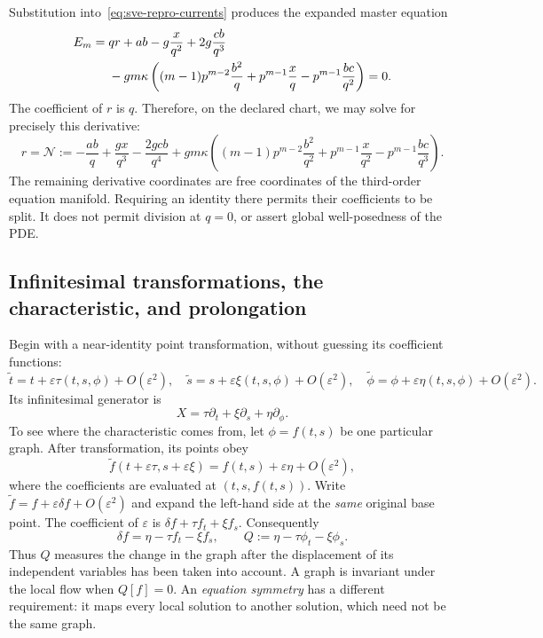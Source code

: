 Substitution into~\eqref{eq:sve-repro-currents} produces the expanded master
equation
\begin{align}
 E_m={}&qr+ab-g\frac{x}{q^2}+2g\frac{cb}{q^3}\notag\\
 &-gm\kappa\left((m-1)p^{m-2}\frac{b^2}{q}
       +p^{m-1}\frac{x}{q}-p^{m-1}\frac{bc}{q^2}\right)=0.
 \label{eq:sve-repro-master}
\end{align}
The coefficient of $r$ is $q$. Therefore, on the declared chart, we may solve
for precisely this derivative:
\begin{equation}
 r=\mathcal N:=-\frac{ab}{q}+\frac{gx}{q^3}-\frac{2gcb}{q^4}
 +gm\kappa\left((m-1)p^{m-2}\frac{b^2}{q^2}
              +p^{m-1}\frac{x}{q^2}-p^{m-1}\frac{bc}{q^3}\right).
 \label{eq:sve-master-normal}
\end{equation}
The remaining derivative coordinates are free coordinates of the
third-order equation manifold. Requiring an identity there permits their
coefficients to be split. It does not permit division at $q=0$, or assert
global well-posedness of the PDE.

\subsection{Infinitesimal transformations, the characteristic, and prolongation}
Begin with a near-identity point transformation, without guessing its
coefficient functions:
\begin{equation}
 \widetilde t=t+\varepsilon\tau(t,s,\phi)+O(\varepsilon^2),\quad
 \widetilde s=s+\varepsilon\xi(t,s,\phi)+O(\varepsilon^2),\quad
 \widetilde\phi=\phi+\varepsilon\eta(t,s,\phi)+O(\varepsilon^2).
 \label{eq:sve-small-transformation}
\end{equation}
Its infinitesimal generator is
\[
 X=\tau\partial_t+\xi\partial_s+\eta\partial_\phi.
\]
To see where the characteristic comes from, let $\phi=f(t,s)$ be one
particular graph. After transformation, its points obey
\[
 \widetilde f(t+\varepsilon\tau,s+\varepsilon\xi)
       =f(t,s)+\varepsilon\eta+O(\varepsilon^2),
\]
where the coefficients are evaluated at $(t,s,f(t,s))$. Write
$\widetilde f=f+\varepsilon\delta f+O(\varepsilon^2)$ and expand the
left-hand side at the \emph{same} original base point. The coefficient of
$\varepsilon$ is $\delta f+\tau f_t+\xi f_s$. Consequently
\begin{equation}
 \delta f=\eta-\tau f_t-\xi f_s,
 \qquad Q:=\eta-\tau\phi_t-\xi\phi_s.
 \label{eq:sve-characteristic-derived}
\end{equation}
Thus $Q$ measures the change in the graph after the displacement of its
independent variables has been taken into account. A graph is invariant
under the local flow when $Q[f]=0$. An \emph{equation symmetry} has a
different requirement: it maps every local solution to another solution,
which need not be the same graph.

